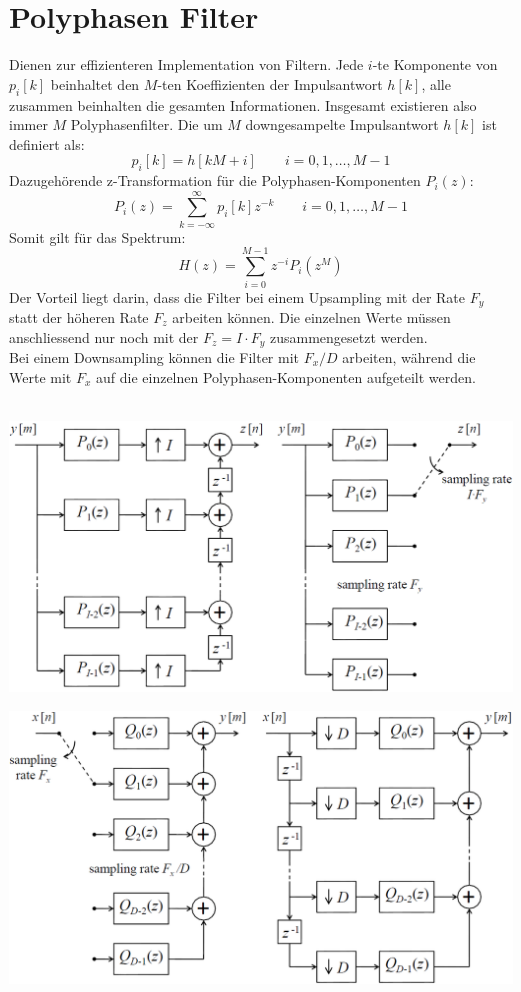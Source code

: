 \section{Polyphasen Filter}
Dienen zur effizienteren Implementation von Filtern. 
Jede $i$-te Komponente von $p_i[k]$ beinhaltet den $M$-ten Koeffizienten der 
Impulsantwort $h[k]$, alle zusammen beinhalten die gesamten Informationen.
Insgesamt existieren also immer $M$ Polyphasenfilter.   
Die um $M$ downgesampelte Impulsantwort $h[k]$ ist definiert als:
\[ p_i[k] = h[kM+i] \qquad i=0,1,\ldots,M-1 \]
Dazugehörende z-Transformation für die Polyphasen-Komponenten $P_i(z)$:
\[ P_i(z) = \sum_{k=-\infty}^{\infty} p_i[k]z^{-k} \qquad i=0,1,\ldots,M-1 \]
Somit gilt für das Spektrum:
\[ H(z) = \sum_{i=0}^{M-1}z^{-i} P_i(z^M) \]
Der Vorteil liegt darin, dass die Filter bei einem Upsampling mit der Rate $F_y$ statt der höheren
Rate $F_z$ arbeiten können. Die einzelnen Werte müssen anschliessend nur noch
mit der $F_z=I \cdot F_y$ zusammengesetzt werden.\\
Bei einem Downsampling können die Filter mit $F_x/D$ arbeiten, während die Werte mit $F_x$ 
auf die einzelnen Polyphasen-Komponenten aufgeteilt werden. \\\\
\begin{minipage}{.48\textwidth}
	\centering
	\includegraphics[width=\textwidth]{../fig/polyphase_up}
\end{minipage}
\begin{minipage}{.48\textwidth}
	\centering
	\includegraphics[width=\textwidth]{../fig/polyphase_down}
\end{minipage}
\newpage

